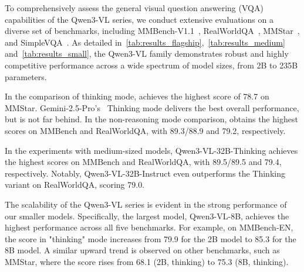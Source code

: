 To comprehensively assess the general visual question answering (VQA) capabilities of the Qwen3-VL series, we conduct extensive evaluations on a diverse set of benchmarks, including MMBench-V1.1~\citep{MMBench}, RealWorldQA~\citep{realworldqa2024}, MMStar~\citep{chen2024we}, and SimpleVQA~\citep{cheng2025simplevqa}. As detailed in~\cref{tab:results_flagship},~\cref{tab:results_medium} and~\cref{tab:results_small}, the Qwen3-VL family demonstrates robust and highly competitive performance across a wide spectrum of model sizes, from 2B to 235B parameters.

In the comparison of thinking mode, \ThinkBig achieves the highest score of 78.7 on MMStar. Gemini-2.5-Pro's~\citep{comanici2025gemini} Thinking mode delivers the best overall performance, but \ThinkBig is not far behind. In the non-reasoning mode comparison, \InstructBig obtains the highest scores on MMBench and RealWorldQA, with 89.3/88.9 and 79.2, respectively. 

In the experiments with medium-sized models, Qwen3-VL-32B-Thinking achieves the highest scores on MMBench and RealWorldQA, with 89.5/89.5 and 79.4, respectively. Notably, Qwen3-VL-32B-Instruct even outperforms the Thinking variant on RealWorldQA, scoring 79.0.

The scalability of the Qwen3-VL series is evident in the strong performance of our smaller models. Specifically, the largest model, Qwen3-VL-8B, achieves the highest performance across all five benchmarks. For example, on MMBench-EN, the score in "thinking" mode increases from 79.9 for the 2B model to 85.3 for the 8B model. A similar upward trend is observed on other benchmarks, such as MMStar, where the score rises from 68.1 (2B, thinking) to 75.3 (8B, thinking).


